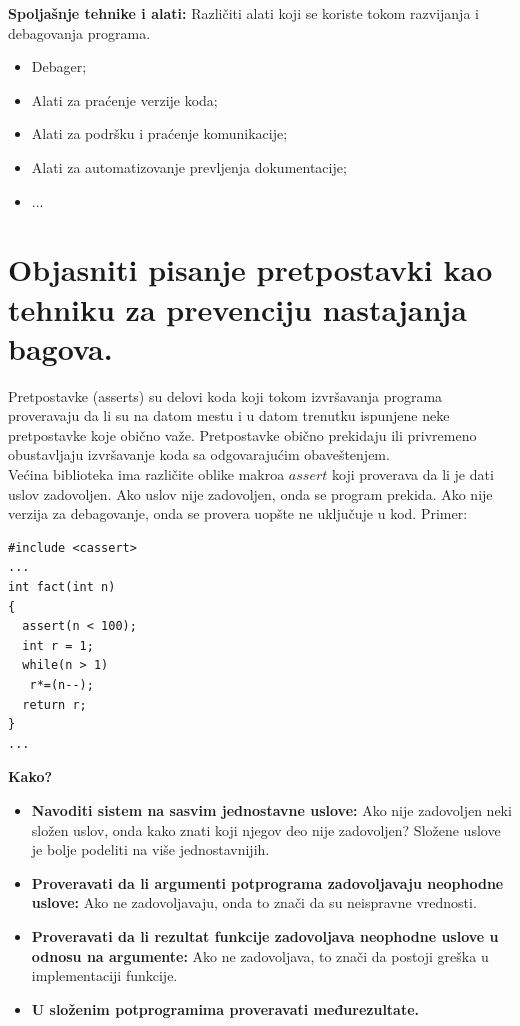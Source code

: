 \documentclass[a4paper]{article}
\begin{document}
  \indent \textbf{Spoljašnje tehnike i alati:} Različiti alati koji se koriste tokom razvijanja
  i debagovanja programa.
  \begin{itemize}
    \item Debager;
    \item Alati za praćenje verzije koda;
    \item Alati za podršku i praćenje komunikacije;
    \item Alati za automatizovanje prevljenja dokumentacije;
    \item ...
  \end{itemize}

\section{Objasniti pisanje pretpostavki kao tehniku za prevenciju nastajanja bagova.}
  Pretpostavke (asserts) su delovi koda koji tokom izvršavanja programa proveravaju da li su
  na datom mestu i u datom trenutku ispunjene neke pretpostavke koje obično važe. Pretpostavke 
  obično prekidaju ili privremeno obustavljaju izvršavanje koda sa odgovarajućim obaveštenjem.\\
  \indent Većina biblioteka ima različite oblike makroa $assert$ koji proverava da li je dati
  uslov zadovoljen. Ako uslov nije zadovoljen, onda se program prekida. Ako nije verzija za
  debagovanje, onda se provera uopšte ne uključuje u kod. Primer:
\begin{lstlisting}
#include <cassert>
...
int fact(int n)
{
  assert(n < 100);
  int r = 1;
  while(n > 1)
   r*=(n--);
  return r;
}
...
\end{lstlisting}
  \textbf{Kako?}
  \begin{itemize}
    \item \textbf{Navoditi sistem na sasvim jednostavne uslove:} Ako nije zadovoljen neki složen uslov,
          onda kako znati koji njegov deo nije zadovoljen? Složene uslove je bolje podeliti
          na više jednostavnijih.
    \item \textbf{Proveravati da li argumenti potprograma zadovoljavaju neophodne uslove:} 
          Ako ne zadovoljavaju, onda to znači da su neispravne vrednosti.
    \item \textbf{Proveravati da li rezultat funkcije zadovoljava neophodne uslove u odnosu na 
          argumente:} Ako ne zadovoljava, to znači da postoji greška u implementaciji funkcije.
      \item \textbf{U složenim potprogramima proveravati međurezultate.}
  \end{itemize}
\end{document}
